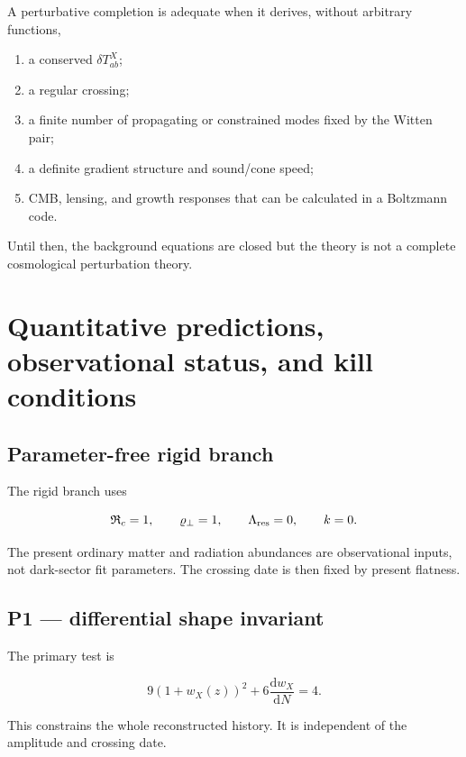 \documentclass[
  11pt,
  letterpaper,
]{article}
\providecommand{\tightlist}{%
  \setlength{\itemsep}{0pt}\setlength{\parskip}{0pt}}
\begin{document}
A perturbative completion is adequate when it derives, without arbitrary
functions,

\begin{enumerate}
\def\labelenumi{\arabic{enumi}.}
\tightlist
\item
  a conserved \(\delta T^X_{ab}\);
\item
  a regular crossing;
\item
  a finite number of propagating or constrained modes fixed by the
  Witten pair;
\item
  a definite gradient structure and sound/cone speed;
\item
  CMB, lensing, and growth responses that can be calculated in a
  Boltzmann code.
\end{enumerate}

Until then, the background equations are closed but the theory is not a
complete cosmological perturbation theory.

\section{Quantitative predictions, observational status, and kill
conditions}\label{quantitative-predictions-observational-status-and-kill-conditions}

\subsection{Parameter-free rigid
branch}\label{parameter-free-rigid-branch}

The rigid branch uses

\[
\mathfrak R_c=1,
\qquad
\varrho_\perp=1,
\qquad
\Lambda_{\rm res}=0,
\qquad
k=0.
\]

The present ordinary matter and radiation abundances are observational
inputs, not dark-sector fit parameters. The crossing date is then fixed
by present flatness.

\subsection{P1 --- differential shape
invariant}\label{p1-differential-shape-invariant}

The primary test is

\[
\boxed{
9(1+w_X(z))^2+6\frac{\mathrm dw_X}{\mathrm dN}=4.
}
\]

This constrains the whole reconstructed history. It is independent of
the amplitude and crossing date.
\end{document}
